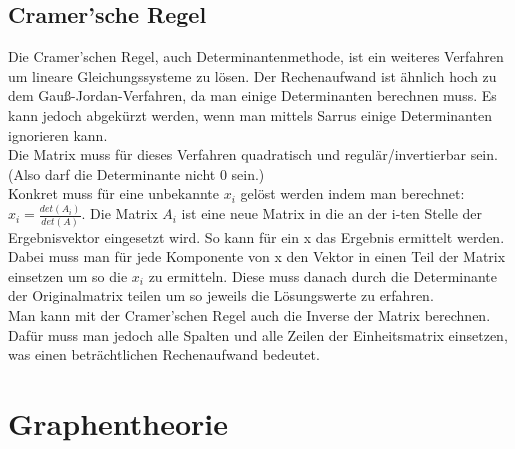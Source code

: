 \documentclass{article}
\begin{document}
	\subsection{Cramer'sche Regel}
	Die Cramer'schen Regel, auch Determinantenmethode, ist ein weiteres Verfahren um lineare Gleichungssysteme zu lösen. Der Rechenaufwand ist ähnlich hoch zu dem Gauß-Jordan-Verfahren, da man einige Determinanten berechnen muss. Es kann jedoch abgekürzt werden, wenn man mittels Sarrus einige Determinanten ignorieren kann. \\
	Die Matrix muss für dieses Verfahren quadratisch und regulär/invertierbar sein. (Also darf die Determinante nicht 0 sein.) \\
	Konkret muss für eine unbekannte $x_i$ gelöst werden indem man berechnet: $x_i=\frac{det(A_i)}{det(A)}$. Die Matrix $A_i$ ist eine neue Matrix in die an der i-ten Stelle der Ergebnisvektor eingesetzt wird. So kann für ein x das Ergebnis ermittelt werden. Dabei muss man für jede Komponente von x den Vektor in einen Teil der Matrix einsetzen um so die $x_i$ zu ermitteln. Diese muss danach durch die Determinante der Originalmatrix teilen um so jeweils die Lösungswerte zu erfahren. \\
	Man kann mit der Cramer'schen Regel auch die Inverse der Matrix berechnen. Dafür muss man jedoch alle Spalten und alle Zeilen der Einheitsmatrix einsetzen, was einen beträchtlichen Rechenaufwand bedeutet.
	




























	\section{Graphentheorie}

	























  
\end{document}
